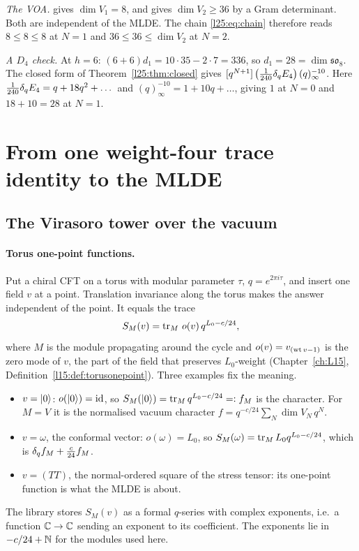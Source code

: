 \begin{example}
\emph{The VOA.}  gives $\dim V_1=8$, and  gives
$\dim V_2\ge36$ by a Gram determinant. Both are independent of the MLDE. The chain \eqref{l25:eq:chain} therefore
reads $8\le8\le8$ at $N=1$ and $36\le36\le\dim V_2$ at $N=2$.

\emph{A $D_4$ check.} At $h=6$: $(6+6)d_1=10\cdot35-2\cdot7=336$, so $d_1=28=\dim\mathfrak{so}_8$. The closed form of
Theorem~\ref{l25:thm:closed} gives $[q^{N+1}]\,\big(\tfrac1{240}\delta_q E_4\big)\,(q)_\infty^{-10}$. Here
$\frac1{240}\delta_q E_4=q+18q^2+\dots$ and $(q)_\infty^{-10}=1+10q+\dots$, giving $1$ at $N=0$ and $18+10=28$ at $N=1$.
\end{example}

\section{From one weight-four trace identity to the MLDE}\label{l25:sec:block}

\subsection{The Virasoro tower over the vacuum}

\paragraph{Torus one-point functions.} Put a chiral CFT on a torus with modular parameter $\tau$, $q=e^{2\pi i\tau}$,
and insert one field $v$ at a point. Translation invariance along the torus makes the answer independent of the point.
It equals the trace
\begin{equation*}
S_M(v)=\operatorname{tr}_M\,o(v)\,q^{L_0-c/24},
\end{equation*}
where $M$ is the module propagating around the cycle and $o(v)=v_{(\operatorname{wt} v-1)}$ is the zero mode of $v$, the part of the
field that preserves $L_0$-weight (Chapter~\ref{ch:L15}, Definition~\ref{l15:def:torusonepoint}). Three examples fix
the meaning.
\begin{itemize}
\item $v=|0\rangle$: $o(|0\rangle)=\mathrm{id}$, so $S_M(|0\rangle)=\operatorname{tr}_Mq^{L_0-c/24}=:f_M$ is the
  character. For $M=V$ it is the normalised vacuum character $f=q^{-c/24}\sum_N\dim V_N\,q^N$.
\item $v=\omega$, the conformal vector: $o(\omega)=L_0$, so $S_M(\omega)=\operatorname{tr}_ML_0q^{L_0-c/24}$, which is
  $\delta_q f_M+\frac c{24}f_M$.
\item $v=(TT)$, the normal-ordered square of the stress tensor: its one-point function is what the MLDE is about.
\end{itemize}
The library stores $S_M(v)$ as a formal $q$-series with complex exponents, i.e.\ a function ${\mathbb{C}}\to{\mathbb{C}}$ sending an
exponent to its coefficient. The exponents lie in $-c/24+{\mathbb{N}}$ for the modules used here.

